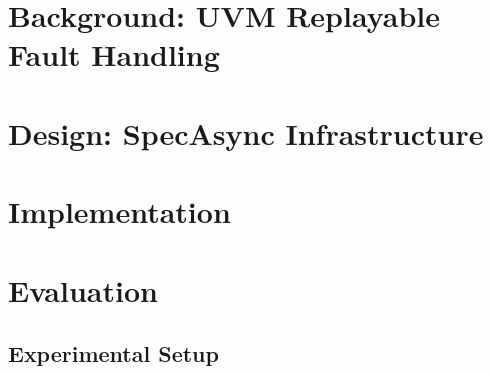\documentclass[journal]{IEEEtran}
\begin{document}
\section{Background: UVM Replayable Fault Handling}
\label{sec:background}

\section{Design: SpecAsync Infrastructure}
\label{sec:design}

\section{Implementation}
\label{sec:implementation}

\section{Evaluation}
\label{sec:evaluation}

\subsection{Experimental Setup}
\label{sec:eval-setup}
\end{document}
